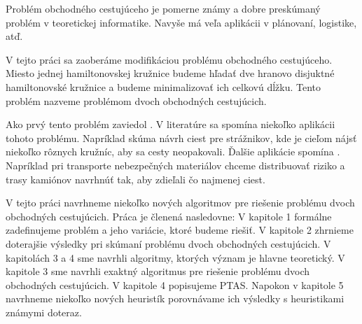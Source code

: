 Problém obchodného cestujúceho je pomerne známy a dobre preskúmaný problém
v teoretickej informatike. Navyše má veľa aplikácii v plánovaní, logistike, atď.

V tejto práci sa zaoberáme modifikáciou problému obchodného cestujúceho.
Miesto jednej hamiltonovskej kružnice budeme hľadať dve hranovo disjuktné
hamiltonovské kružnice a budeme minimalizovať ich celkovú dĺžku.
Tento problém nazveme problémom dvoch obchodných cestujúcich.

Ako prvý tento problém zaviedol \cite{krarup}. V literatúre sa spomína niekoľko aplikácii
tohoto problému. Napríklad \cite{appl} skúma návrh ciest pre strážnikov, kde je cieľom
nájsť niekoľko rôznych kružníc, aby sa cesty neopakovali. Ďalšie aplikácie
spomína \cite{duchenne}. Napríklad pri transporte nebezpečných materiálov
chceme distribuovať riziko a trasy kamiónov navrhnúť tak, aby zdieľali čo
najmenej ciest.

V tejto práci navrhneme niekoľko nových algoritmov pre riešenie
problému dvoch obchodných cestujúcich. Práca je členená nasledovne:
V kapitole 1 formálne zadefinujeme problém a jeho variácie, ktoré budeme riešiť.
V kapitole 2 zhrnieme doterajšie výsledky pri skúmaní problému dvoch
obchodných cestujúcich. V kapitolách 3 a 4 sme navrhli algoritmy, ktorých
význam je hlavne teoretický. V kapitole 3 sme navrhli exaktný algoritmus
pre riešenie problému dvoch obchodných cestujúcich. V kapitole 4 popisujeme
PTAS. Napokon v kapitole 5 navrhneme niekoľko nových heuristík
porovnávame ich výsledky s heuristikami známymi doteraz. 



